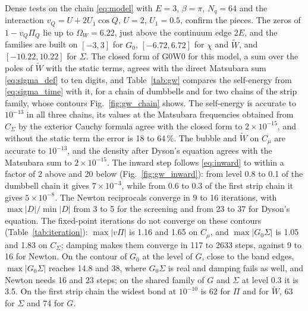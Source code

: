 \documentclass[aps,prb,reprint,a4paper]{revtex4-2}
\begin{document}
Dense tests on the chain \eqref{eq:model} with $E=3$, $\beta=\pi$, $N_q=64$ and the interaction $v_Q=U+2U_1\cos Q$, $U=2$, $U_1=0.5$, confirm the pieces. The zeros of $1-v_Q\Pi_Q$ lie up to $\Omega_W=6.22$, just above the continuum edge $2E$, and the families are built on $[-3,3]$ for $G_0$, $[-6.72,6.72]$ for $\chi$ and $\tilde W$, and $[-10.22,10.22]$ for $\Sigma$. The closed form of G0W0 for this model, a sum over the poles of $\tilde W$ with the static terms, agrees with the direct Matsubara sum \eqref{eq:sigma_def} to ten digits, and Table~\ref{tab:gw} compares the self-energy from \eqref{eq:sigma_time} with it, for a chain of dumbbells and for two chains of the strip family, whose contours Fig.~\ref{fig:gw_chain} shows. The self-energy is accurate to $10^{-13}$ in all three chains, its values at the Matsubara frequencies obtained from $C_\Sigma$ by the exterior Cauchy formula agree with the closed form to $2\times10^{-15}$, and without the static term the error is 18 to 64\,\%. The bubble and $\tilde W$ on $C_\mu$ are accurate to $10^{-13}$, and the density after Dyson's equation agrees with the Matsubara sum to $2\times10^{-15}$. The inward step follows \eqref{eq:inward} to within a factor of 2 above and 20 below (Fig.~\ref{fig:gw_inward}): from level 0.8 to 0.1 of the dumbbell chain it gives $7\times10^{-3}$, while from 0.6 to 0.3 of the first strip chain it gives $5\times10^{-8}$. The Newton reciprocals converge in 9 to 16 iterations, with $\max\lvert D\rvert/\min\lvert D\rvert$ from 3 to 5 for the screening and from 23 to 37 for Dyson's equation. The fixed-point iterations do not converge on these contours (Table~\ref{tab:iteration}): $\max\lvert v\Pi\rvert$ is 1.16 and 1.65 on $C_\mu$, and $\max\lvert G_0\Sigma\rvert$ is 1.05 and 1.83 on $C_\Sigma$; damping makes them converge in 117 to 2633 steps, against 9 to 16 for Newton. On the contour of $G_0$ at the level of $G$, close to the band edges, $\max\lvert G_0\Sigma\rvert$ reaches 14.8 and 38, where $G_0\Sigma$ is real and damping fails as well, and Newton needs 16 and 23 steps; on the shared family of $G$ and $\Sigma$ at level 0.3 it is 3.5. On the first strip chain the widest bond at $10^{-10}$ is 62 for $\Pi$ and for $\tilde W$, 63 for $\Sigma$ and 74 for $G$.
\end{document}
